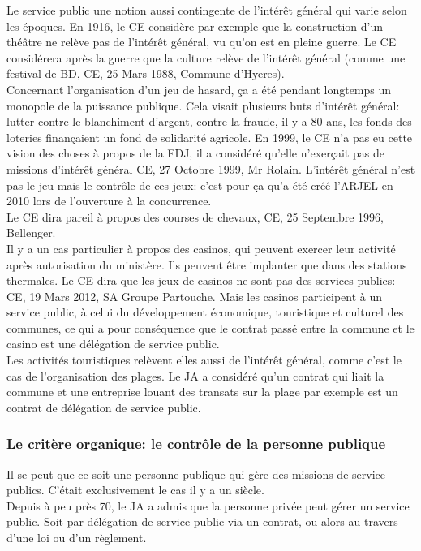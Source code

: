 \documentclass[10pt, a4paper, openany]{book}
\begin{document}
Le service public une notion aussi contingente de l'intérêt général qui varie selon les époques. En 1916, le CE considère par exemple que la construction d'un théâtre ne relève pas de l'intérêt général, vu qu'on est en pleine guerre. Le CE considérera après la guerre que la culture relève de l'intérêt général (comme une festival de BD, CE, 25 Mars 1988, Commune d'Hyeres). \\
Concernant l'organisation d'un jeu de hasard, ça a été pendant longtemps un monopole de la puissance publique. Cela visait plusieurs buts d'intérêt général: lutter contre le blanchiment d'argent, contre la fraude, il y a 80 ans, les fonds des loteries finançaient un fond de solidarité agricole. En 1999, le CE n'a pas eu cette vision des choses à propos de la FDJ, il a considéré qu'elle n'exerçait pas de missions d'intérêt général CE, 27 Octobre 1999, Mr Rolain. L'intérêt général n'est pas le jeu mais le contrôle de ces jeux: c'est pour ça qu'a été créé l'ARJEL en 2010 lors de l'ouverture à la concurrence. \\
Le CE dira pareil à propos des courses de chevaux, CE, 25 Septembre 1996, Bellenger. \\
Il y a un cas particulier à propos des casinos, qui peuvent exercer leur activité après autorisation du ministère. Ils peuvent être implanter que dans des stations thermales. Le CE dira que les jeux de casinos ne sont pas des services publics: CE, 19 Mars 2012, SA Groupe Partouche. Mais les casinos participent à un service public, à celui du développement économique, touristique et culturel des communes, ce qui a pour conséquence que le contrat passé entre la commune et le casino est une délégation de service public. \\
Les activités touristiques relèvent elles aussi de l'intérêt général, comme c'est le cas de l'organisation des plages. Le JA a considéré qu'un contrat qui liait la commune et une entreprise louant des transats sur la plage par exemple est un contrat de délégation de service public. 

\subsubsection{Le critère organique: le contrôle de la personne publique}

Il se peut que ce soit une personne publique qui gère des missions de service publics. C'était exclusivement le cas il y a un siècle. \\
Depuis à peu près 70, le JA a admis que la personne privée peut gérer un service public. Soit par délégation de service public via un contrat, ou alors au travers d'une loi ou d'un règlement. 
\end{document}
